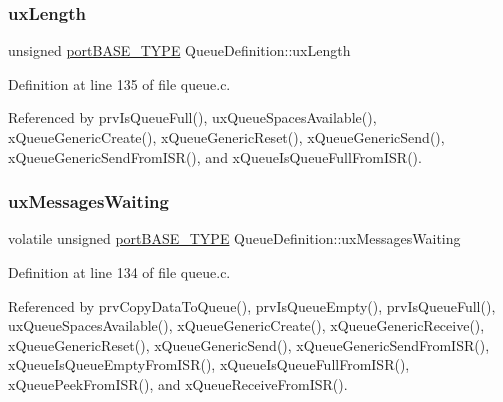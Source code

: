 \mbox{\label{structQueueDefinition_af1edbb7426dad16a57e1fc6bb475bc7e}} 
\subsubsection{\texorpdfstring{ux\+Length}{uxLength}}
{\footnotesize\ttfamily unsigned \hyperlink{portmacro_8h_a1ebe82d24d764ae4e352f7c3a9f92c01}{port\+B\+A\+S\+E\+\_\+\+T\+Y\+PE} Queue\+Definition\+::ux\+Length}



Definition at line 135 of file queue.\+c.



Referenced by prv\+Is\+Queue\+Full(), ux\+Queue\+Spaces\+Available(), x\+Queue\+Generic\+Create(), x\+Queue\+Generic\+Reset(), x\+Queue\+Generic\+Send(), x\+Queue\+Generic\+Send\+From\+I\+S\+R(), and x\+Queue\+Is\+Queue\+Full\+From\+I\+S\+R().

\mbox{\label{structQueueDefinition_a8e3b24b25631daa65cc8b860346013e3}} 
\subsubsection{\texorpdfstring{ux\+Messages\+Waiting}{uxMessagesWaiting}}
{\footnotesize\ttfamily volatile unsigned \hyperlink{portmacro_8h_a1ebe82d24d764ae4e352f7c3a9f92c01}{port\+B\+A\+S\+E\+\_\+\+T\+Y\+PE} Queue\+Definition\+::ux\+Messages\+Waiting}



Definition at line 134 of file queue.\+c.



Referenced by prv\+Copy\+Data\+To\+Queue(), prv\+Is\+Queue\+Empty(), prv\+Is\+Queue\+Full(), ux\+Queue\+Spaces\+Available(), x\+Queue\+Generic\+Create(), x\+Queue\+Generic\+Receive(), x\+Queue\+Generic\+Reset(), x\+Queue\+Generic\+Send(), x\+Queue\+Generic\+Send\+From\+I\+S\+R(), x\+Queue\+Is\+Queue\+Empty\+From\+I\+S\+R(), x\+Queue\+Is\+Queue\+Full\+From\+I\+S\+R(), x\+Queue\+Peek\+From\+I\+S\+R(), and x\+Queue\+Receive\+From\+I\+S\+R().

\mbox{\label{structQueueDefinition_a0582284771e9c079fa3276a31f3805ad}} 
